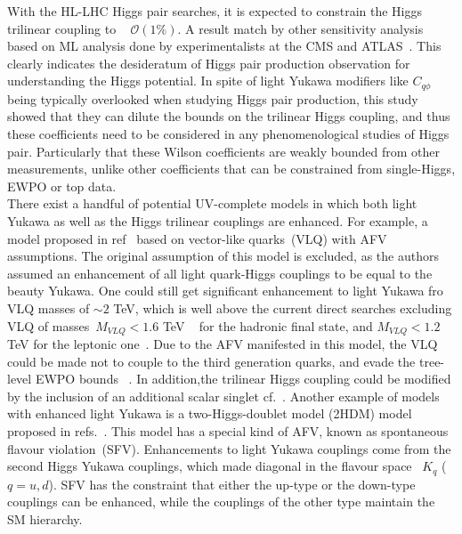 With the HL-LHC Higgs pair searches, it is expected to constrain the Higgs trilinear coupling to ~ $\mathcal{O}(1\%)$. A result match by other sensitivity analysis based on ML analysis done by experimentalists at the CMS and ATLAS~\cite{ATL-PHYS-PUB-2018-053,ATLAS:2018rvj,CMS-PAS-FTR-18-011}. This clearly indicates the desideratum of Higgs pair production observation for understanding the Higgs potential. In spite of light Yukawa modifiers like $C_{q\phi}$ being typically overlooked when studying Higgs pair production, this study showed that they can dilute the  bounds on the trilinear Higgs coupling, and thus these coefficients need to be considered in any phenomenological studies of Higgs pair. Particularly that these Wilson coefficients are weakly bounded from other measurements, unlike other coefficients that can be constrained from single-Higgs, EWPO or top data. \\
There exist a handful of potential UV-complete models in which both light Yukawa as well as the Higgs trilinear couplings are enhanced. For example, a model proposed in ref~\cite{Bar-Shalom:2018rjs} based on vector-like quarks~(VLQ) with AFV assumptions. The original assumption of this model is excluded, as the authors assumed an enhancement of all light quark-Higgs couplings to be equal to the beauty Yukawa. One could still get significant enhancement to light Yukawa fro VLQ masses of $ \sim 2$ TeV, which is well above the current direct searches excluding VLQ of masses~$ M_{VLQ} < 1.6$ TeV ~\cite{Unal:2777832,CMS:2019eqb} for the hadronic final state, and $M_{VLQ}< 1.2$ TeV for the leptonic one~\cite{CMS:2018wpl}. Due to the AFV manifested in this model, the VLQ could be made not to couple to the third generation quarks, and evade the tree-level EWPO bounds ~\cite{Dawson:2020oco}. In addition,the trilinear Higgs coupling could be modified by the inclusion of an additional scalar singlet cf.~\cite{DiLuzio:2017tfn, Falkowski:2019tft, Chang:2019vez}.  Another example of models with enhanced light Yukawa is a two-Higgs-doublet model (2HDM) model proposed in refs.~\cite{Egana-Ugrinovic:2019dqu,Egana-Ugrinovic:2021uew}. This model has a special kind of AFV, known as spontaneous flavour violation~(SFV).  Enhancements to light Yukawa couplings come from the second Higgs Yukawa couplings, which made diagonal in the flavour space ~$K_{q}$ ($q=u,d$). SFV has  the constraint that either the up-type or the down-type couplings can be enhanced, while the couplings of the other type maintain the SM hierarchy. 
